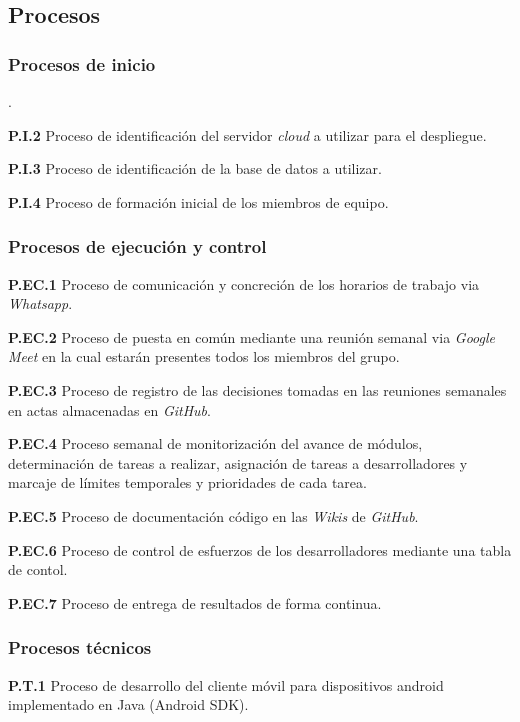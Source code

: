 \documentclass{article}
\begin{document}
\subsection{Procesos}

\subsubsection{Procesos de inicio}.

\textbf{P.I.2} Proceso de identificación del servidor \textit{cloud} a utilizar para el despliegue.

\textbf{P.I.3} Proceso de identificación de la base de datos a utilizar.

\textbf{P.I.4} Proceso de formación inicial de los miembros de equipo.

\subsubsection{Procesos de ejecución y control}

\textbf{P.EC.1} Proceso de comunicación y concreción de los horarios de trabajo via \textit{Whatsapp}.

\textbf{P.EC.2} Proceso de puesta en común mediante una reunión semanal via \textit{Google Meet} en la cual estarán presentes todos los miembros del grupo.

\textbf{P.EC.3} Proceso de registro de las decisiones tomadas en las reuniones semanales en actas almacenadas en \textit{GitHub}.

\textbf{P.EC.4} Proceso semanal de monitorización del avance de módulos, determinación de tareas a realizar, asignación de tareas a desarrolladores y marcaje de límites temporales y prioridades de cada tarea.

\textbf{P.EC.5} Proceso de documentación código en las \textit{Wikis} de \textit{GitHub}.

\textbf{P.EC.6} Proceso de control de esfuerzos de los desarrolladores mediante una tabla de contol.

\textbf{P.EC.7} Proceso de entrega de resultados de forma continua.

\subsubsection{Procesos técnicos}

\textbf{P.T.1} Proceso de desarrollo del cliente móvil para dispositivos android implementado en Java (Android SDK).
\end{document}
